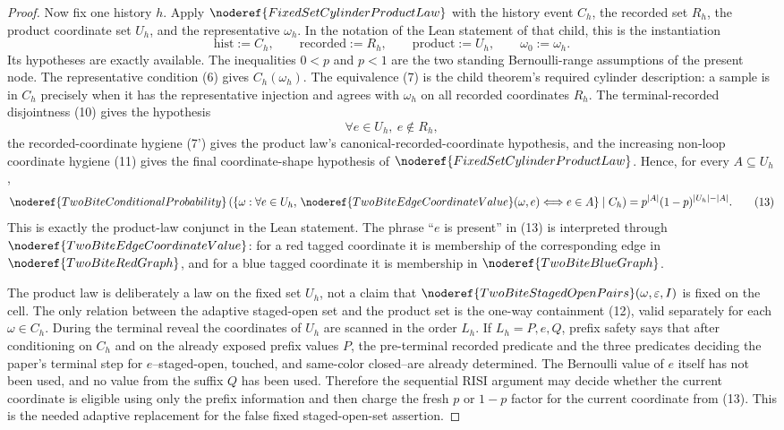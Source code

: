 \begin{proof}
Now fix one history \(h\).  Apply
\(\noderef{FixedSetCylinderProductLaw}\) with the history event \(C_h\), the
recorded set \(R_h\), the product coordinate set \(U_h\), and the
representative \(\omega_h\).  In the notation of the Lean statement of that
child, this is the instantiation
\[
\mathrm{hist}:=C_h,\qquad
\mathrm{recorded}:=R_h,\qquad
\mathrm{product}:=U_h,\qquad
\omega_0:=\omega_h .
\]
Its hypotheses are exactly available.  The inequalities \(0<p\) and \(p<1\)
are the two standing Bernoulli-range assumptions of the present node.  The
representative condition (6) gives \(C_h(\omega_h)\).  The equivalence (7) is
the child theorem's required cylinder description: a sample is in \(C_h\)
precisely when it has the representative injection and agrees with
\(\omega_h\) on all recorded coordinates \(R_h\).  The terminal-recorded
disjointness (10) gives the hypothesis
\[
\forall e\in U_h,\ e\notin R_h,
\]
the recorded-coordinate hygiene (7') gives the product law's
canonical-recorded-coordinate hypothesis, and the increasing non-loop
coordinate hygiene (11) gives the final coordinate-shape hypothesis of
\(\noderef{FixedSetCylinderProductLaw}\).  Hence, for every
\(A\subseteq U_h\),
\[
\noderef{TwoBiteConditionalProbability}
\left(
\{\omega:\forall e\in U_h,\,
\noderef{TwoBiteEdgeCoordinateValue}(\omega,e)
\Longleftrightarrow e\in A\}
\mid C_h
\right)
=p^{|A|}(1-p)^{|U_h|-|A|}. \tag{13}
\]
This is exactly the product-law conjunct in the Lean statement.  The phrase
``\(e\) is present'' in (13) is interpreted through
\(\noderef{TwoBiteEdgeCoordinateValue}\): for a red tagged coordinate it is
membership of the corresponding edge in \(\noderef{TwoBiteRedGraph}\), and
for a blue tagged coordinate it is membership in
\(\noderef{TwoBiteBlueGraph}\).

The product law is deliberately a law on the fixed set \(U_h\), not a claim
that \(\noderef{TwoBiteStagedOpenPairs}(\omega,\varepsilon,I)\) is fixed on
the cell.  The only relation between the adaptive staged-open set and the
product set is the one-way containment (12), valid separately for each
\(\omega\in C_h\).  During the terminal reveal the coordinates of \(U_h\) are scanned
in the order \(L_h\).  If \(L_h=P,e,Q\), prefix safety says that after
conditioning on \(C_h\) and on the already exposed prefix values \(P\), the
pre-terminal recorded predicate and the three predicates deciding the paper's
terminal step for \(e\)--staged-open, touched, and same-color closed--are
already determined.  The Bernoulli value of \(e\) itself has not been used,
and no value from the suffix \(Q\) has been used.  Therefore the sequential
RISI argument may decide whether the current coordinate is eligible using only
the prefix information and then charge the fresh \(p\) or \(1-p\) factor for
the current coordinate from (13).  This is the needed adaptive replacement for the false fixed
staged-open-set assertion.


\end{proof}
